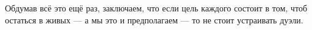 Обдумав всё это ещё раз, заключаем, что если цель каждого состоит в том, чтоб остаться в живых --- а мы это и предполагаем --- то не стоит устраивать дуэли.
\heart

